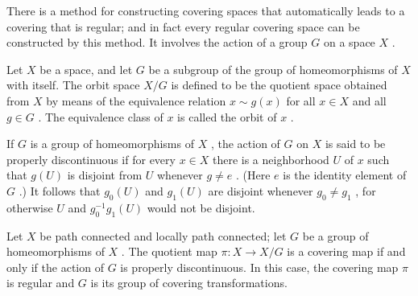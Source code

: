 There is a method for constructing covering spaces that automatically leads to a covering that is regular; and in fact every regular covering space can be constructed by this method. It involves the action of a group \(G\) on a space \(X\) .

\begin{definition} Let \(X\) be a space, and let \(G\) be a subgroup of the group of homeomorphisms of \(X\) with itself. The orbit space \(X/G\) is defined to be the quotient space obtained from \(X\) by means of the equivalence relation \(x \sim  g\left( x\right)\) for all \(x \in  X\) and all \(g \in  G\) . The equivalence class of \(x\) is called the orbit of \(x\) .
\end{definition}

\begin{definition} If \(G\) is a group of homeomorphisms of \(X\) , the action of \(G\) on \(X\) is said to be properly discontinuous if for every \(x \in  X\) there is a neighborhood \(U\) of \(x\) such that \(g\left( U\right)\) is disjoint from \(U\) whenever \(g \neq  e\) . (Here \(e\) is the identity element of \(G\) .) It follows that \({g}_{0}\left( U\right)\) and \({g}_{1}\left( U\right)\) are disjoint whenever \({g}_{0} \neq  {g}_{1}\) , for otherwise \(U\) and \({g}_{0}^{-1}{g}_{1}\left( U\right)\) would not be disjoint.
\end{definition}

\begin{theorem} Let \(X\) be path connected and locally path connected; let \(G\) be a group of homeomorphisms of \(X\) . The quotient map \(\pi  : X \rightarrow  X/G\) is a covering map if and only if the action of \(G\) is properly discontinuous. In this case, the covering map \(\pi\) is regular and \(G\) is its group of covering transformations.
\end{theorem}

